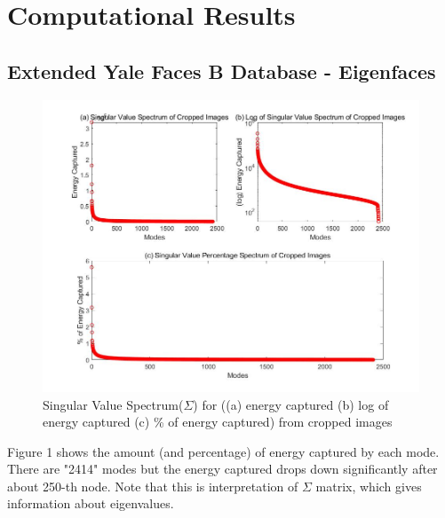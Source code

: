 \documentclass[11pt,a4paper]{article}
\numberwithin{equation}{subsection}
\begin{document}
\section{Computational Results}
\subsection{Extended Yale Faces B Database - Eigenfaces}
\begin{figure}[H]
\begin{center}
\includegraphics[scale=0.25]{S1.jpg}
\caption{Singular Value Spectrum($\Sigma$) for ((a) energy captured (b) log of energy captured (c) \% of energy captured) from cropped images}
\end{center}
\end{figure}
Figure 1 shows the amount (and percentage) of energy captured by each mode. There are "2414" modes but the energy captured drops down significantly after about 250-th node. Note that this is interpretation of $\Sigma$ matrix, which gives information about eigenvalues.
\end{document}
